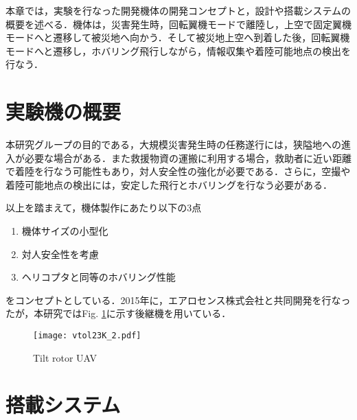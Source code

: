 本章では，実験を行なった開発機体の開発コンセプトと，設計や搭載システムの概要を述べる．機体は，災害発生時，回転翼機モードで離陸し，上空で固定翼機モードへと遷移して被災地へ向かう．そして被災地上空へ到着した後，回転翼機モードへと遷移し，ホバリング飛行しながら，情報収集や着陸可能地点の検出を行なう．

\section{実験機の概要}
本研究グループの目的である，大規模災害発生時の任務遂行には，狭隘地への進入が必要な場合がある．また救援物資の運搬に利用する場合，救助者に近い距離で着陸を行なう可能性もあり，対人安全性の強化が必要である．さらに，空撮や着陸可能地点の検出には，安定した飛行とホバリングを行なう必要がある．

以上を踏まえて，機体製作にあたり以下の3点
	\begin{enumerate}
	\item 機体サイズの小型化
	\item 対人安全性を考慮
	\item ヘリコプタと同等のホバリング性能
	\end{enumerate}
をコンセプトとしている．2015年に，エアロセンス株式会社と共同開発を行なったが，本研究ではFig. \ref{fig:vtol23k}に示す後継機を用いている．

\begin{figure}[H]
\centering
\texttt{[image: vtol23K\_2.pdf]}
\caption{Tilt rotor UAV}
\label{fig:vtol23k}
\end{figure}


\section{搭載システム}
